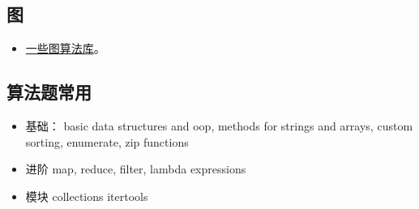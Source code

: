 \subsection{图}
\begin{itemize}
\item \href{https://wiki.python.org/moin/PythonGraphLibraries}{一些图算法库}。
\end{itemize}

\subsection{算法题常用}
\begin{itemize}
\item 基础： basic data structures and oop, methods for strings and arrays, custom sorting, enumerate, zip functions
\item 进阶 map, reduce, filter, lambda expressions
\item 模块 collections itertools
\end{itemize}
